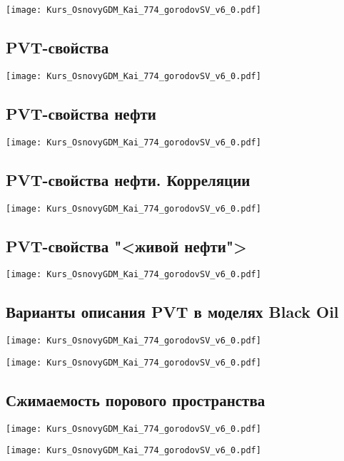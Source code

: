\documentclass[main.tex]{subfiles}
\begin{document}
\texttt{[image: Kurs\_OsnovyGDM\_Kai\_774\_gorodovSV\_v6\_0.pdf]}

\subsection{PVT-свойства}

\texttt{[image: Kurs\_OsnovyGDM\_Kai\_774\_gorodovSV\_v6\_0.pdf]}

\subsection{PVT-свойства нефти}

\texttt{[image: Kurs\_OsnovyGDM\_Kai\_774\_gorodovSV\_v6\_0.pdf]}

\subsection{PVT-свойства нефти. Корреляции}

\texttt{[image: Kurs\_OsnovyGDM\_Kai\_774\_gorodovSV\_v6\_0.pdf]}

\subsection{PVT-свойства "<живой нефти">}

\texttt{[image: Kurs\_OsnovyGDM\_Kai\_774\_gorodovSV\_v6\_0.pdf]}

\subsection{Варианты описания PVT в моделях Black Oil}

\texttt{[image: Kurs\_OsnovyGDM\_Kai\_774\_gorodovSV\_v6\_0.pdf]}

\texttt{[image: Kurs\_OsnovyGDM\_Kai\_774\_gorodovSV\_v6\_0.pdf]}

\subsection{Сжимаемость порового пространства}

\texttt{[image: Kurs\_OsnovyGDM\_Kai\_774\_gorodovSV\_v6\_0.pdf]}

\texttt{[image: Kurs\_OsnovyGDM\_Kai\_774\_gorodovSV\_v6\_0.pdf]}
\end{document}
